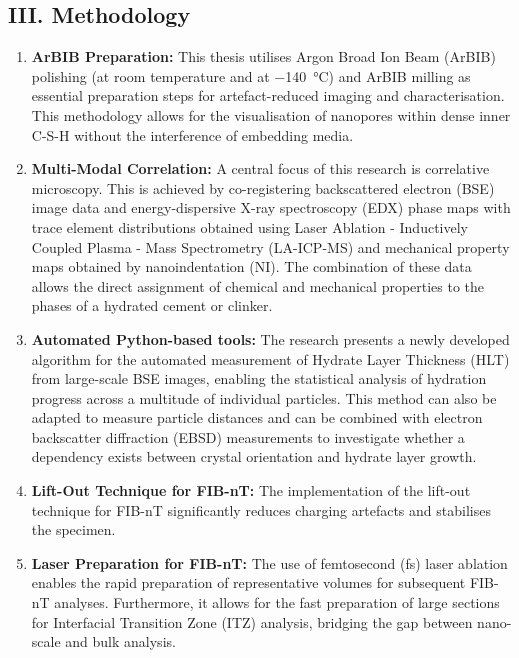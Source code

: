 \documentclass[11pt, a4paper]{article}
\begin{document}
\subsection*{III. Methodology}

\begin{enumerate}[label=\textbf{\arabic*.}, leftmargin=1.5cm, labelsep=0.5cm, itemsep=0.5em, resume]
    \item \textbf{ArBIB Preparation:} This thesis utilises Argon Broad Ion Beam (ArBIB) polishing (at room temperature and at \qty{-140}{\celsius}) and ArBIB milling as essential preparation steps for artefact-reduced imaging and characterisation.
    This methodology allows for the visualisation of nanopores within dense inner C-S-H without the interference of embedding media.
    \item \textbf{Multi-Modal Correlation:} A central focus of this research is correlative microscopy.
    This is achieved by co-registering backscattered electron (BSE) image data and energy-dispersive X-ray spectroscopy (EDX) phase maps with trace element distributions obtained using Laser Ablation - Inductively Coupled Plasma - Mass Spectrometry (LA-ICP-MS) and mechanical property maps obtained by nanoindentation (NI).
    The combination of these data allows the direct assignment of chemical and mechanical properties to the phases of a hydrated cement or clinker.
    \item \textbf{Automated Python-based tools:} The research presents a newly developed algorithm for the automated measurement of Hydrate Layer Thickness (HLT) from large-scale BSE images, enabling the statistical analysis of hydration progress across a multitude of individual particles.
    This method can also be adapted to measure particle distances and can be combined with electron backscatter diffraction (EBSD) measurements to investigate whether a dependency exists between crystal orientation and hydrate layer growth.
    \item \textbf{Lift-Out Technique for FIB-nT:} The implementation of the lift-out technique for FIB-nT significantly reduces charging artefacts and stabilises the specimen.
    \item \textbf{Laser Preparation for FIB-nT:} The use of femtosecond (fs) laser ablation enables the rapid preparation of representative volumes for subsequent FIB-nT analyses.
    Furthermore, it allows for the fast preparation of large sections for Interfacial Transition Zone (ITZ) analysis, bridging the gap between nano-scale and bulk analysis.
\end{enumerate}
\end{document}
